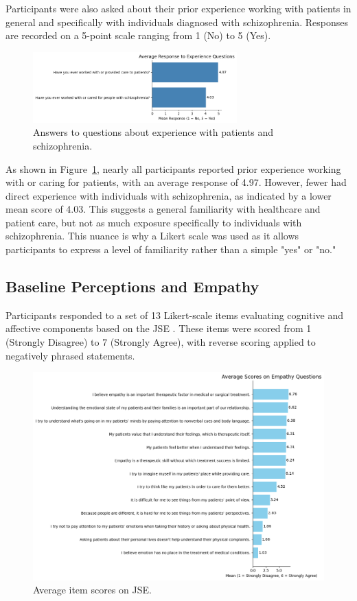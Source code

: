 Participants were also asked about their prior experience working with patients in general and specifically with individuals diagnosed with schizophrenia. Responses are recorded on a 5-point scale ranging from 1 (No) to 5 (Yes).

\begin{figure}[H]
    \centering
    \includegraphics[width=0.7\textwidth]{../../Figures/experience-patients.png}
    \caption{Answers to questions about experience with patients and schizophrenia.}
    \label{fig:experience_patients}
\end{figure}

As shown in Figure~\ref{fig:experience_patients}, nearly all participants reported prior experience working with or caring for patients, with an average response of 4.97. However, fewer had direct experience with individuals with schizophrenia, as indicated by a lower mean score of 4.03. This suggests a general familiarity with healthcare and patient care, but not as much exposure specifically to individuals with schizophrenia. This nuance is why a Likert scale was used as it allows participants to express a level of familiarity rather than a simple "yes" or "no."

\subsection{Baseline Perceptions and Empathy}

Participants responded to a set of 13 Likert-scale items evaluating cognitive and affective components based on the JSE \cite{Hojat2002}. These items were scored from 1 (Strongly Disagree) to 7 (Strongly Agree), with reverse scoring applied to negatively phrased statements.

\begin{figure}[htbp]
    \centering
    \includegraphics[width=\columnwidth]{../../Figures/avg-scores-pre.png}
    \caption{Average item scores on JSE.}
    \label{fig:avg_scores_pre}
\end{figure}

